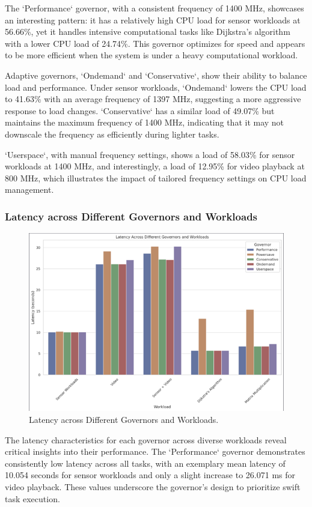\documentclass[conference]{IEEEtran}
\begin{document}
The `Performance` governor, with a consistent frequency of 1400 MHz, showcases an interesting pattern: it has a relatively high CPU load for sensor workloads at 56.66\%, yet it handles intensive computational tasks like Dijkstra's algorithm with a lower CPU load of 24.74\%. This governor optimizes for speed and appears to be more efficient when the system is under a heavy computational workload.

Adaptive governors, `Ondemand` and `Conservative`, show their ability to balance load and performance. Under sensor workloads, `Ondemand` lowers the CPU load to 41.63\% with an average frequency of 1397 MHz, suggesting a more aggressive response to load changes. `Conservative` has a similar load of 49.07\% but maintains the maximum frequency of 1400 MHz, indicating that it may not downscale the frequency as efficiently during lighter tasks.

`Userspace`, with manual frequency settings, shows a load of 58.03\% for sensor workloads at 1400 MHz, and interestingly, a load of 12.95\% for video playback at 800 MHz, which illustrates the impact of tailored frequency settings on CPU load management. 

\subsubsection{Latency across Different Governors and Workloads}
\begin{figure}[ht]
    \centering
    \includegraphics[width=0.75\linewidth]{cpu_latency_plot.png}
    \caption{Latency across Different Governors and Workloads.}
    \label{fig:latency}
\end{figure}
\vspace{10pt}

The latency characteristics for each governor across diverse workloads reveal critical insights into their performance. The `Performance` governor demonstrates consistently low latency across all tasks, with an exemplary mean latency of 10.054 seconds for sensor workloads and only a slight increase to 26.071 ms for video playback. These values underscore the governor's design to prioritize swift task execution.
\end{document}
